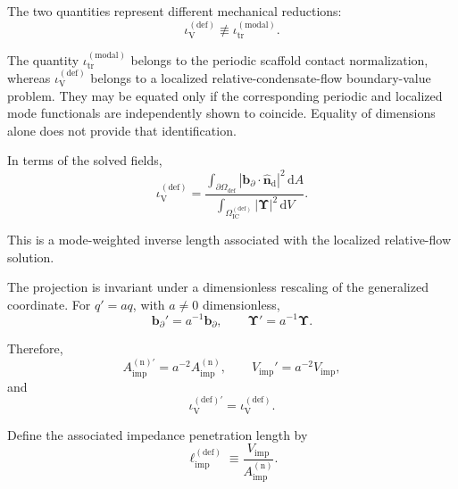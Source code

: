The two quantities represent different mechanical reductions:
\begin{equation}
    \label{eq:AP_projection_distinction}
    \iota_{\mathrm{V}}^{(\mathrm{def})}\not\equiv\iota_{\mathrm{tr}}^{(\mathrm{modal})}.
\end{equation}

The quantity $\iota_{\mathrm{tr}}^{(\mathrm{modal})}$ belongs to the periodic scaffold contact normalization, whereas $\iota_{\mathrm{V}}^{(\mathrm{def})}$ belongs to a localized relative-condensate-flow boundary-value problem. They may be equated only if the corresponding periodic and localized mode functionals are independently shown to coincide. Equality of dimensions alone does not provide that identification.

In terms of the solved fields,
\begin{equation}
    \iota_{\mathrm{V}}^{(\mathrm{def})}
    =
    \frac{\displaystyle\int_{\partial\Omega_{\mathrm{def}}}|\mathbf{b}_{\partial}\cdot\hat{\mathbf{n}}_{\mathrm{d}}|^{2}\,\mathrm{d}A}
    {\displaystyle\int_{\Omega_{\mathrm{IC}}^{(\mathrm{def})}}|\boldsymbol{\Upsilon}|^{2}\,\mathrm{d}V}.
\end{equation}

This is a mode-weighted inverse length associated with the localized relative-flow solution.

The projection is invariant under a dimensionless rescaling of the generalized coordinate. For $q'=a q$, with $a\neq0$ dimensionless,
\begin{equation}
    \mathbf{b}_{\partial}'=a^{-1}\mathbf{b}_{\partial},\qquad\boldsymbol{\Upsilon}'=a^{-1}\boldsymbol{\Upsilon}.
\end{equation}

Therefore,
\begin{equation}
    A_{\mathrm{imp}}^{(\mathrm{n})\prime}=a^{-2}A_{\mathrm{imp}}^{(\mathrm{n})},\qquad V_{\mathrm{imp}}'=a^{-2}V_{\mathrm{imp}},
\end{equation}
and
\begin{equation}
    \iota_{\mathrm{V}}^{(\mathrm{def})\prime}=\iota_{\mathrm{V}}^{(\mathrm{def})}.
\end{equation}

Define the associated impedance penetration length by
\begin{equation}
    \ell_{\mathrm{imp}}^{(\mathrm{def})}\equiv\frac{V_{\mathrm{imp}}}{A_{\mathrm{imp}}^{(\mathrm{n})}}.
\end{equation}

